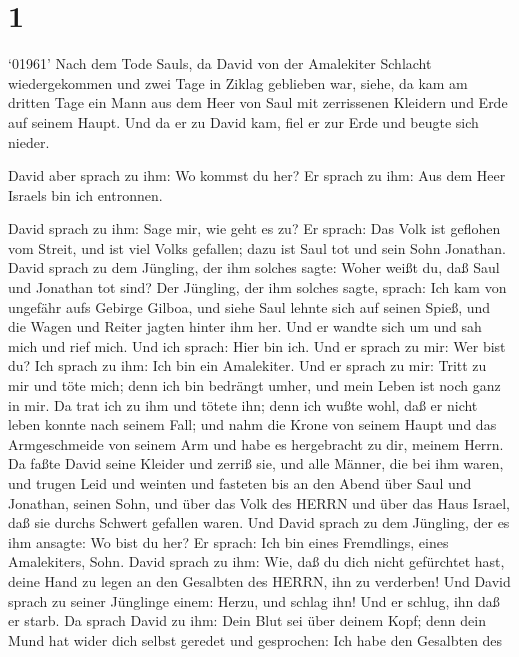 \hypertarget{section}{%
\section{1}\label{section}}

 `01961' Nach dem Tode Sauls, da David von der Amalekiter
Schlacht wiedergekommen und zwei Tage in Ziklag geblieben war,
 siehe, da kam am dritten Tage ein Mann aus dem Heer von
Saul mit zerrissenen Kleidern und Erde auf seinem Haupt. Und da er zu
David kam, fiel er zur Erde und beugte sich nieder.

 David aber sprach zu ihm: Wo kommst du her? Er sprach zu
ihm: Aus dem Heer Israels bin ich entronnen.

 David sprach zu ihm: Sage mir, wie geht es zu? Er sprach:
Das Volk ist geflohen vom Streit, und ist viel Volks gefallen; dazu ist
Saul tot und sein Sohn Jonathan.  David sprach zu dem
Jüngling, der ihm solches sagte: Woher weißt du, daß Saul und Jonathan
tot sind?  Der Jüngling, der ihm solches sagte, sprach: Ich
kam von ungefähr aufs Gebirge Gilboa, und siehe Saul lehnte sich auf
seinen Spieß, und die Wagen und Reiter jagten hinter ihm her.
 Und er wandte sich um und sah mich und rief mich. Und ich
sprach: Hier bin ich.  Und er sprach zu mir: Wer bist du?
Ich sprach zu ihm: Ich bin ein Amalekiter.  Und er sprach zu
mir: Tritt zu mir und töte mich; denn ich bin bedrängt umher, und mein
Leben ist noch ganz in mir.  Da trat ich zu ihm und tötete
ihn; denn ich wußte wohl, daß er nicht leben konnte nach seinem Fall;
und nahm die Krone von seinem Haupt und das Armgeschmeide von seinem Arm
und habe es hergebracht zu dir, meinem Herrn.  Da faßte
David seine Kleider und zerriß sie, und alle Männer, die bei ihm waren,
 und trugen Leid und weinten und fasteten bis an den Abend
über Saul und Jonathan, seinen Sohn, und über das Volk des HERRN und
über das Haus Israel, daß sie durchs Schwert gefallen waren.
 Und David sprach zu dem Jüngling, der es ihm ansagte: Wo
bist du her? Er sprach: Ich bin eines Fremdlings, eines Amalekiters,
Sohn.  David sprach zu ihm: Wie, daß du dich nicht
gefürchtet hast, deine Hand zu legen an den Gesalbten des HERRN, ihn zu
verderben!  Und David sprach zu seiner Jünglinge einem:
Herzu, und schlag ihn! Und er schlug, ihn daß er starb.  Da
sprach David zu ihm: Dein Blut sei über deinem Kopf; denn dein Mund hat
wider dich selbst geredet und gesprochen: Ich habe den Gesalbten des
